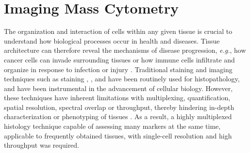 




\section{Imaging Mass Cytometry}  %
\label{sec:IMC}


The organization and interaction of cells within any given tissue is crucial to understand how biological processes occur in health and diseases. Tissue architecture can therefore reveal the mechanisms of disease progression, \textit{e.g.}, how cancer cells can invade surrounding tissues or how immune cells infiltrate and organize in response to infection or injury \textbf{\cite{veenstra_research_2021}}. Traditional staining and imaging techniques such as  staining \textbf{\cite{titford_progress_2009}},  \textbf{\cite{ortiz_hidalgo_immunohistochemistry_2022}}, and  \textbf{\cite{odell_immunofluorescence_2013}} have been routinely used for histopathology, and have been instrumental in the advancement of cellular biology. However, these techniques have inherent limitations with multiplexing, quantification, spatial resolution, spectral overlap or throughput, thereby hindering in-depth characterization or phenotyping of tissues \textbf{\cite{veenstra_research_2021,leroux_imaging_2021}}. As a result, a highly multiplexed histology technique capable of assessing many markers at the same time, applicable to frequently obtained tissues, with single-cell resolution and high throughput was required.


